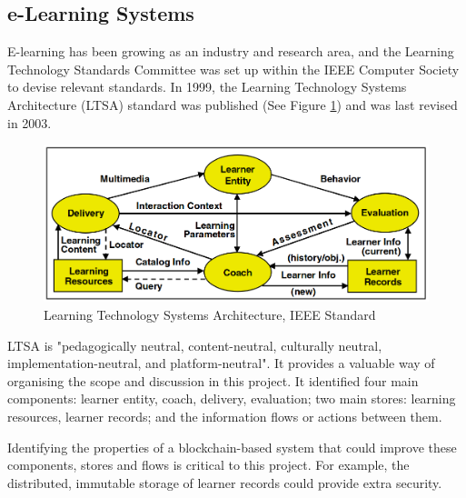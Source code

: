 \subsection{e-Learning Systems}

E-learning has been growing as an industry and research area, and the Learning Technology Standards Committee
was set up within the IEEE Computer Society to devise relevant standards. In 1999, the Learning Technology
Systems Architecture (LTSA) standard was published (See Figure \ref{fig:LTSA}) and was last revised in 2003.

\begin{figure}[!ht]
	\centering
	\includegraphics[width=1.0\textwidth]{ltsa2003}
	\caption[Learning Technology Systems Architecture]
	{Learning Technology Systems Architecture, IEEE Standard \citep[p.9]{ieee2003ltsa}}
	\label{fig:LTSA}
\end{figure}

LTSA is "pedagogically neutral, content-neutral, culturally neutral, implementation-neutral,
and platform-neutral"\citep[p.1]{ieee2003ltsa}. It provides a valuable way of organising
the scope and discussion in this project. It identified four main components: learner entity, coach,
delivery, evaluation; two main stores: learning resources, learner records; and the information flows
or actions between them.

Identifying the properties of a blockchain-based system that could improve these components, stores and
flows is critical to this project. For example, the distributed, immutable storage of learner records could
provide extra security.



